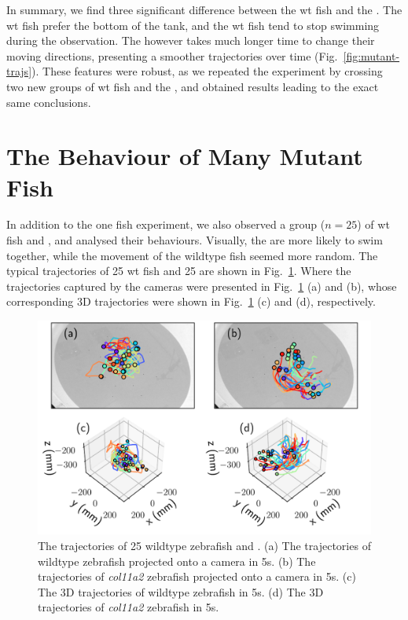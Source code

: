 \documentclass[11pt,twoside]{report}
\begin{document}
In summary, we find three significant difference between the wt fish and the {\mf}.
The wt fish prefer the bottom of the tank, and the wt fish tend to stop swimming during the observation.
The {\mf} however takes much longer time to change their moving directions, presenting a smoother trajectories over time (Fig.~\ref{fig:mutant-trajs}).
These features were robust, as we repeated the experiment by crossing two new groups of wt fish and the {\mf}, and obtained results leading to the exact same conclusions.



\section{The Behaviour of Many Mutant Fish}

In addition to the one fish experiment, we also observed a group ($n = 25$) of wt fish and {\mf}, and analysed their behaviours.
Visually, the {\mf} are more likely to swim together, while the movement of the wildtype fish seemed more random. The typical trajectories of 25 wt fish and 25 {\mf} are shown in Fig.~\ref{fig:traj-mutant}. Where the trajectories captured by the cameras were presented in Fig.~\ref{fig:traj-mutant} (a) and (b), whose corresponding 3D trajectories were shown in Fig.~\ref{fig:traj-mutant} (c) and (d), respectively.

\begin{figure}
  \includegraphics[width=\linewidth]{traj-mutant}
  \caption[The trajectories of 25 wildtype zebrafish and {\mf}]{
  	The trajectories of 25 wildtype zebrafish and {\mf}.
  	(a) The trajectories of wildtype zebrafish projected onto a camera in 5s.
  	(b) The trajectories of \emph{col11a2} zebrafish projected onto a camera in 5s.
  	(c) The 3D trajectories of wildtype zebrafish in 5s.
  	(d) The 3D trajectories of \emph{col11a2} zebrafish in 5s.
  }
  \label{fig:traj-mutant}
\end{figure}
\end{document}
